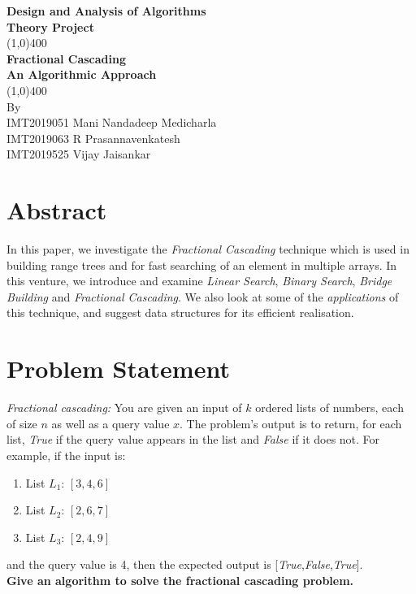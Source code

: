 \documentclass[11pt]{article}
\begin{document}
\begin{titlepage}
\begin{center}
\vspace*{0.5cm}
\Large{\textbf{Design and Analysis of Algorithms}}\\
\Large{\textbf{Theory Project}}\\
\vfill
\line(1,0){400}\\[1mm]
\huge{\textbf{Fractional Cascading}}\\[3mm]
\Large{\textbf{An Algorithmic Approach}}\\[1mm]
\line(1,0){400}\\
\vfill
By \\ 
IMT2019051 Mani Nandadeep Medicharla \\
IMT2019063 R Prasannavenkatesh \\
IMT2019525 Vijay Jaisankar \\
\end{center}
\end{titlepage}

\tableofcontents
\thispagestyle{empty}
\clearpage
\setcounter{page}{1}

\section{Abstract}
        In this paper, we investigate the \textit{Fractional Cascading} technique which is used in building range trees and for fast searching of an element in multiple arrays. In this venture, we introduce and examine \textit{Linear Search}, \textit{Binary Search}, \textit{Bridge Building} and \textit{Fractional Cascading}. We also look at some of the \textit{applications} of this technique, and suggest data structures for its efficient realisation. 

\section{Problem Statement}
\textit{Fractional cascading: }You are given an input of $k$ ordered lists of numbers, each of size $n$ as well as a query value $x$. The problem's output is
to return, for each list, \textit{True} if the query value appears in the list and
\textit{False} if it does not. For example, if the input is:
\begin{enumerate}[label=(\alph*)]
    \item List $L_1$: $[3,4,6]$
    \item List $L_2$: $[2,6,7]$
    \item List $L_3$: $[2,4,9]$
\end{enumerate}
and the query value is 4, then the expected output is [\textit{True},\textit{False},\textit{True}]. \\
\textbf{Give an algorithm to solve the fractional cascading problem.}
\end{document}

